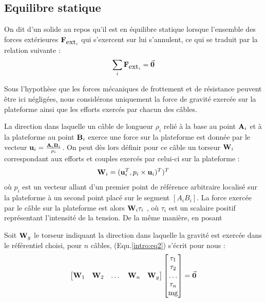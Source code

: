 \subsection{Equilibre statique}

On dit d'un solide au repos qu'il est en équilibre statique lorsque l'ensemble des forces extérieures $\mathcal {\bf F}_{\hbox{ext}_i}$ qui s'exercent sur lui s'annulent, ce qui se traduit par la relation suivante :
\begin{equation}
\sum_i \mathcal {\bf F}_{\hbox{ext}_i} = \vec {\bf 0}
\label{intro:eq2}
\end{equation}

Sous l'hypothèse que les forces mécaniques de frottement et de résistance peuvent être ici négligées, nous considérons uniquement la force de gravité exercée sur la plateforme ainsi que les efforts exercés par chacun des câbles.

La direction dans laquelle un câble de longueur $\rho_i$ relié à la base au point ${\bf A}_i$ et à la plateforme au point ${\bf B}_i$ exerce une force sur la plateforme est donnée par le vecteur ${\bf u}_i = \frac{{\bf A}_i{\bf B}_i}{\rho_i}$. On peut dès lors définir pour ce câble un torseur ${\bf W}_i$ correspondant aux efforts et couples exercés par celui-ci sur la plateforme :
\begin{equation}
{\bf W}_i = ({\bf u}_i^T, p_i \times {\bf u}_i)^T)^T
\label{intro:eq3}
\end{equation}
où $p_i$ est un vecteur allant d'un premier point de référence arbitraire localisé sur la plateforme à un second point placé sur le segment $[A_iB_i]$. La force exercée par le câble sur la plateforme est alors ${\bf W}_i \tau_i$ , où $\tau_i$ est un scalaire positif représentant l'intensité de la tension. De la même manière, en posant 


Soit ${\bf W}_g$ le torseur indiquant la direction dans laquelle la gravité est exercée dans le référentiel choisi, pour $n$ câbles, (Equ.\ref{intro:eq2}) s'écrit pour nous :
\begin{equation}
\begin{bmatrix}
 {\bf W}_1 & {\bf W}_2 & \dots & {\bf W}_n & {\bf W}_g
\end{bmatrix}
\begin{bmatrix}
 \tau_1 \\ \tau_2 \\ \dots \\ \tau_n \\ \hbox{mg}
\end{bmatrix}
= \vec {\bf 0}
\label{intro:eq4}
\end{equation}

